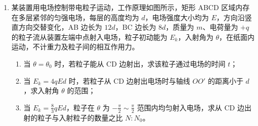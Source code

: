 \documentclass[\gkver]{gaokaozhenti}
\begin{document}
\begin{enumerate}
{\begin{enumerate}
	\item
	货物从静止开始以加速度 $a$ 做匀加速直线运动，根据运动学公式可知 $L=\frac{1}{2}at^{2}$，解得 $a=\frac{2L}{t^{2}}$，货物到达 B 点时的速度大小为 $v=at=\frac{2L}{t}$。

	货物在机械臂的作用下在水平方向上做匀加速直线运动，机械臂对货物的作用力即为货物所受合力 $ma$，所以经过 $t$ 时间，货物运动到 B 点时机械臂对其做功的瞬时功率为 $P = ma v = m \cdot \frac{2L}{t^{2}} \cdot \frac{2L}{t} = \frac{4mL^{2}}{t^{3}}$。

	\item
	空间站和货物同轴转动，角速度 $\omega_{0}$ 相同，对质量为 $m_{0}$ 空间站，质量为 $M$ 的地球提供向心力 $G\frac{Mm_{0}}{r^{2}}=m_{0}\omega_{0}^{2}r$，解得 $GM = \omega_{0}^{2} r^{3}$。

	货物在机械臂的作用力 $F_{1}$ 和万有引力 $F_{2}$ 的作用下做匀速圆周运动，则 $F_{2}-F_{1}=m\omega_{0}^{2}(r-d)$。

	货物受到的万有引力 $F_{2}=G\frac{Mm}{(r-d)^{2}}=\frac{m\omega_{0}^{2}r^{3}}{(r-d)^{2}}$，解得机械臂对货物的作用力大小为 $F_{1}=\frac{m\omega_{0}^{2}r^{3}}{(r-d)^{2}}-m\omega_{0}^{2}(r-d)=m\omega_{0}^{2}\frac{r^{3}-(r-d)^{3}}{(r-d)^{2}}$，则 $\frac{F_{1}}{F_{2}} = \frac{r^{3} - (r - d)^{3}}{r^{3}}$。
\end{enumerate}
}

\item
某装置用电场控制带电粒子运动，工作原理如图所示，矩形 ABCD 区域内存在多层紧邻的匀强电场，每层的高度均为 $d$，电场强度大小均为 $E$，方向沿竖直方向交替变化，AB 边长为 $12d$，BC 边长为 $8d$，质量为 $m$、电荷量为 $+q$ 的粒子流从装置左端中点射入电场，粒子初动能为 $E_{k}$，入射角为 $\theta$，在纸面内运动，不计重力及粒子间的相互作用力。
\begin{enumerate}
	\item
	当 $\theta = \theta_{0}$ 时，若粒子能从 CD 边射出，求该粒子通过电场的时间 $t$；
	\item
	当 $E_{k} = 4qEd$ 时，若粒子从 CD 边射出电场时与轴线 $OO'$ 的距离小于 $d$，求入射角 $\theta$ 的范围；
	\item
	当 $E_{k} = \frac{8}{3}qEd$，粒子在 $\theta$ 为 $-\frac{\pi}{2} \sim \frac{\pi}{2}$ 范围内均匀射入电场，求从 CD 边出射的粒子与入射粒子的数量之比 $N:N_{0}$。
\end{enumerate}


\end{enumerate}
\end{document}

